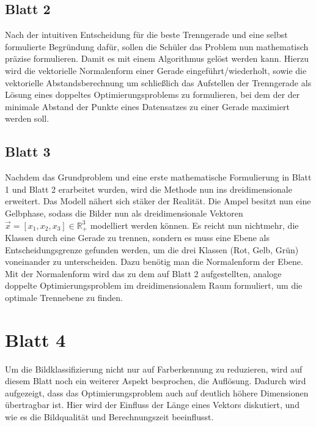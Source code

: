         \subsection{Blatt 2}
            Nach der intuitiven Entscheidung für die beste Trenngerade und eine selbst formulierte Begründung dafür, sollen die Schüler das Problem nun mathematisch präzise formulieren. Damit es mit einem Algorithmus gelöst werden kann.
            Hierzu wird die vektorielle Normalenform einer Gerade eingeführt/wiederholt, sowie die vektorielle Abstandsberechnung um schließlich das Aufstellen der Trenngerade als Lösung eines doppeltes Optimierungsproblems zu formulieren, bei dem der der minimale Abstand der Punkte eines Datensatzes zu einer Gerade maximiert werden soll. 
        \subsection{Blatt 3}
            Nachdem das Grundproblem und eine erste mathematische Formulierung in Blatt 1 und Blatt 2 erarbeitet wurden, wird die Methode nun ins dreidimensionale erweitert. Das Modell nähert sich stäker der Realität. Die Ampel besitzt nun eine Gelbphase, sodass die Bilder nun als dreidimensionale Vektoren $\vec{x}=[x_1, x_2, x_3] \in \mathbb{R}_+^3$ modelliert werden können.
            Es reicht nun nichtmehr, die Klassen durch eine Gerade zu trennen, sondern es muss eine Ebene als Entscheidungsgrenze gefunden werden, um die drei Klassen (Rot, Gelb, Grün) voneinander zu unterscheiden.
            Dazu benötig man die Normalenform der Ebene. Mit der Normalenform wird das zu dem auf Blatt 2 aufgestellten, analoge doppelte Optimierungsproblem im dreidimensionalem Raum formuliert, um die optimale Trennebene zu finden.
        \section{Blatt 4}
            Um die Bildklassifizierung nicht nur auf Farberkennung zu reduzieren, wird auf diesem Blatt noch ein weiterer Aspekt besprochen, die Auflösung. Dadurch wird aufgezeigt, dass das Optimierungsproblem auch auf deutlich höhere Dimensionen übertragbar ist.
            Hier wird der Einfluss der Länge eines Vektors diskutiert, und wie es die Bildqualität und Berechnungszeit beeinflusst.
